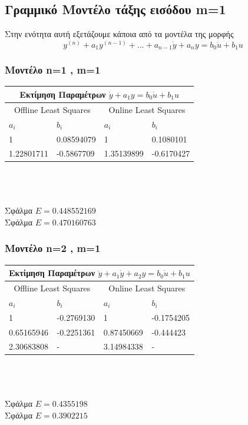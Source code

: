 \documentclass[12pt]{article}
\begin{document}
\subsection{Γραμμικό Μοντέλο τάξης εισόδου m=1}
Στην ενότητα αυτή εξετάζουμε κάποια από τα μοντέλα της μορφής
\[ y^{(n)}+a_1y^{(n-1)}+...+a_{n-1}\dot{y}+a_{n}y=b_{0}\dot{u}+b_{1}u\]
\subsubsection{Μοντέλο n=1 , m=1}
\begin{tabular}{ |p{2.5cm}|p{2.5cm}||p{2.5cm}|p{2.5cm}| }
\hline
\multicolumn{4}{|c|}{ Εκτίμηση Παραμέτρων  $\dot{y}+a_1 y= b_{0}\dot{u}+b_{1}u$}\\
\hline
\multicolumn{2}{|c||}{Offline Least Squares}&
\multicolumn{2}{|c|}{Online Least Squares }
\\
\hline
$ a_{i}$ & $b_i$ &$ a_{i}$ & $b_i$  \\
\hline
 1          & 0.08594079 &          1   &  0.1080101 \\
1.22801711  & -0.5867709 &  1.35139899  & -0.6170427 \\
\hline
\end{tabular}
\\ \\\\
Σφάλμα $E=0.448552169$ \\
Σφάλμα $E=0.470160763$ 
\subsubsection{Μοντέλο n=2 , m=1}
\begin{tabular}{ |p{2.5cm}|p{2.5cm}||p{2.5cm}|p{2.5cm}| }
\hline
\multicolumn{4}{|c|}{ Εκτίμηση Παραμέτρων  $\ddot{y}+a_1\dot{y}+a_2 y= b_{0}\dot{u}+b_{1}u$}\\
\hline
\multicolumn{2}{|c||}{Offline Least Squares}&
\multicolumn{2}{|c|}{Online Least Squares }
\\
\hline
$ a_{i}$ & $b_i$ &$ a_{i}$ & $b_i$  \\
\hline
 1          & -0.2769130 & 1   &  -0.1754205 \\
0.65165946  & -0.2251361 &0.87450669  &-0.444423 \\
2.30683808  & -          &3.14984338& - \\
\hline
\end{tabular}
\\ \\\\
Σφάλμα $E=0.4355198$ \\
Σφάλμα $E=0.3902215$
\end{document}
